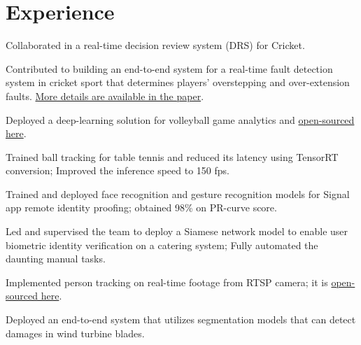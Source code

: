 \documentclass[]{deedy-resume-reversed}
\begin{document}
%
%

%
%

%
%

\begin{minipage}[t]{0.60\textwidth}


\section{Experience}
\vspace{\topsep} %
\begin{tightemize}
\item Collaborated in a real-time decision review system (DRS) for Cricket.
\item Contributed to building an end-to-end system for a real-time fault detection system in cricket sport that determines players' overstepping and over-extension faults. \color{hyperlinks}\href{https://ieeexplore.ieee.org/abstract/document/10356526}{More details are available in the paper}.
\item Deployed a deep-learning solution for volleyball game analytics and \href{https://github.com/masouduut94/volleyball_analytics}{open-sourced here}.
\item Trained ball tracking for table tennis and reduced its latency using TensorRT conversion; Improved the inference speed to 150 fps.
\end{tightemize}
\sectionsep

\begin{tightemize}
\item Trained and deployed face recognition and gesture recognition models for Signal app remote identity proofing; obtained 98\% on PR-curve score.
\item Led and supervised the team to deploy a Siamese network model to enable user biometric identity verification on a catering system; Fully automated the daunting manual tasks. 
\item Implemented person tracking on real-time footage from RTSP camera; it is \href{https://github.com/ZQPei/deep_sort_pytorch}{open-sourced here}.
\item Deployed an end-to-end system that utilizes segmentation models that can detect damages in wind turbine blades.



\end{tightemize}
\end{minipage}
\end{document}
